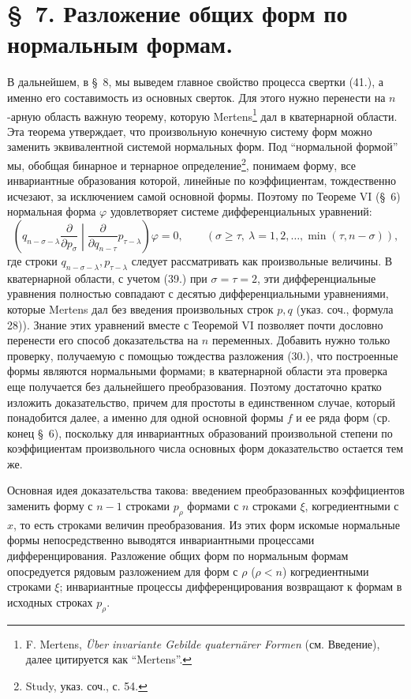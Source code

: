 \documentclass[11pt]{article}
\begin{document}
\section*{\S\ 7. Разложение общих форм по нормальным формам.}

В дальнейшем, в \S\ 8, мы выведем главное свойство процесса свертки (41.), а именно его составимость из основных сверток. Для этого нужно перенести на $n$-арную область важную теорему, которую Mertens\footnote{F. Mertens, \emph{\"Uber invariante Gebilde quatern\"arer Formen} (см. Введение), далее цитируется как ``Mertens''.} дал в кватернарной области. Эта теорема утверждает, что произвольную конечную систему форм можно заменить эквивалентной системой нормальных форм. Под ``нормальной формой'' мы, обобщая бинарное и тернарное определение\footnote{Study, указ. соч., с. 54.}, понимаем форму, все инвариантные образования которой, линейные по коэффициентам, тождественно исчезают, за исключением самой основной формы. Поэтому по Теореме VI (\S\ 6) нормальная форма $\varphi$ удовлетворяет системе дифференциальных уравнений:
\begin{equation}
 \left(q_{n-\sigma-\lambda}\frac{\partial}{\partial p_\sigma}\middle|\frac{\partial}{\partial q_{n-\tau}}p_{\tau-\lambda}\right)\varphi=0,
 \qquad(\sigma\ge\tau,\ \lambda=1,2,\ldots,\min(\tau,n-\sigma)),
\tag{46}
\end{equation}
где строки $q_{n-\sigma-\lambda},p_{\tau-\lambda}$ следует рассматривать как произвольные величины. В кватернарной области, с учетом (39.) при $\sigma=\tau=2$, эти дифференциальные уравнения полностью совпадают с десятью дифференциальными уравнениями, которые Mertens дал без введения произвольных строк $p,q$ (указ. соч., формула 28)). Знание этих уравнений вместе с Теоремой VI позволяет почти дословно перенести его способ доказательства на $n$ переменных. Добавить нужно только проверку, получаемую с помощью тождества разложения (30.), что построенные формы являются нормальными формами; в кватернарной области эта проверка еще получается без дальнейшего преобразования. Поэтому достаточно кратко изложить доказательство, причем для простоты в единственном случае, который понадобится далее, а именно для одной основной формы $f$ и ее ряда форм (ср. конец \S\ 6), поскольку для инвариантных образований произвольной степени по коэффициентам произвольного числа основных форм доказательство остается тем же.

Основная идея доказательства такова: введением преобразованных коэффициентов заменить форму с $n-1$ строками $p_\rho$ формами с $n$ строками $\xi$, когредиентными с $x$, то есть строками величин преобразования. Из этих форм искомые нормальные формы непосредственно выводятся инвариантными процессами дифференцирования. Разложение общих форм по нормальным формам опосредуется рядовым разложением для форм с $\rho$ ($\rho<n$) когредиентными строками $\xi$; инвариантные процессы дифференцирования возвращают к формам в исходных строках $p_\rho$.
\end{document}

